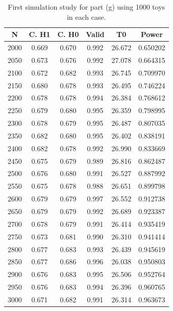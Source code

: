 \documentclass[12pt]{article}
\begin{document}
\begin{table}
  \centering
  \begin{tabular}{| c | c | c | c | c | c |}
      \hline
         N & C. H1 & C. H0 & Valid & T0     & Power    \\
      \hline
      2000 & 0.669 & 0.670 & 0.992 & 26.672 & 0.650202 \\
      \hline
      2050 & 0.673 & 0.676 & 0.992 & 27.078 & 0.664315 \\
      \hline
      2100 & 0.672 & 0.682 & 0.993 & 26.745 & 0.709970 \\
      \hline
      2150 & 0.680 & 0.678 & 0.993 & 26.495 & 0.746224 \\
      \hline
      2200 & 0.678 & 0.678 & 0.994 & 26.384 & 0.768612 \\
      \hline
      2250 & 0.679 & 0.680 & 0.995 & 26.359 & 0.798995 \\
      \hline
      2300 & 0.678 & 0.679 & 0.995 & 26.487 & 0.807035 \\
      \hline
      2350 & 0.682 & 0.680 & 0.995 & 26.402 & 0.838191 \\
      \hline
      2400 & 0.682 & 0.678 & 0.992 & 26.990 & 0.833669 \\
      \hline
      2450 & 0.675 & 0.679 & 0.989 & 26.816 & 0.862487 \\
      \hline
      2500 & 0.676 & 0.680 & 0.991 & 26.527 & 0.887992 \\
      \hline
      2550 & 0.675 & 0.678 & 0.988 & 26.651 & 0.899798 \\
      \hline
      2600 & 0.679 & 0.679 & 0.997 & 26.552 & 0.912738 \\
      \hline
      2650 & 0.679 & 0.679 & 0.992 & 26.689 & 0.923387 \\
      \hline
      2700 & 0.678 & 0.679 & 0.991 & 26.414 & 0.935419 \\
      \hline
      2750 & 0.673 & 0.681 & 0.990 & 26.310 & 0.941414 \\
      \hline
      2800 & 0.677 & 0.683 & 0.993 & 26.439 & 0.945619 \\
      \hline
      2850 & 0.677 & 0.686 & 0.996 & 26.038 & 0.950803 \\
      \hline
      2900 & 0.676 & 0.683 & 0.995 & 26.506 & 0.952764 \\
      \hline
      2950 & 0.676 & 0.683 & 0.994 & 26.396 & 0.960765 \\
      \hline
      3000 & 0.671 & 0.682 & 0.991 & 26.314 & 0.963673 \\
      \hline
  \end{tabular}
\caption{First simulation study for part (g) using 1000 toys in each case.}
\label{tab_g_1}
\end{table}
\end{document}
